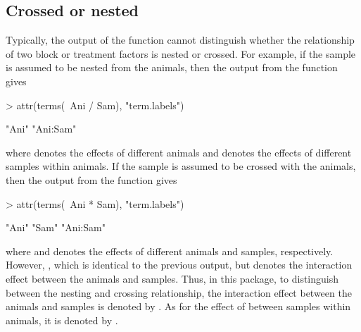 \documentclass[article]{jss}
\begin{document}
\subsection{Crossed or nested}
Typically, the output of the  function cannot distinguish whether the relationship of two block or treatment factors is nested or crossed. For example, if the sample is assumed to be nested from the animals, then the output from the  function gives
\begin{CodeChunk}
\begin{CodeInput}
> attr(terms(~Ani / Sam), "term.labels")
\end{CodeInput}
\begin{CodeOutput}
[1] "Ani"     "Ani:Sam"
\end{CodeOutput}
\end{CodeChunk}
where  denotes the effects of different animals and  denotes the effects of different samples within animals. If the sample is assumed to be crossed with the animals, then the output from the  function gives
\begin{CodeChunk}
\begin{CodeInput}
> attr(terms(~Ani * Sam), "term.labels")
\end{CodeInput}
\begin{CodeOutput}
[1] "Ani"     "Sam"     "Ani:Sam"
\end{CodeOutput}
\end{CodeChunk}
where  and  denotes the effects of different animals and samples, respectively. However, , which is identical to the previous output, but denotes the interaction effect between the animals and samples. Thus, in this package, to distinguish between the nesting and crossing relationship, the interaction effect between the animals and samples is denoted by . As for the effect of between samples within animals, it is denoted by .
\end{document}
